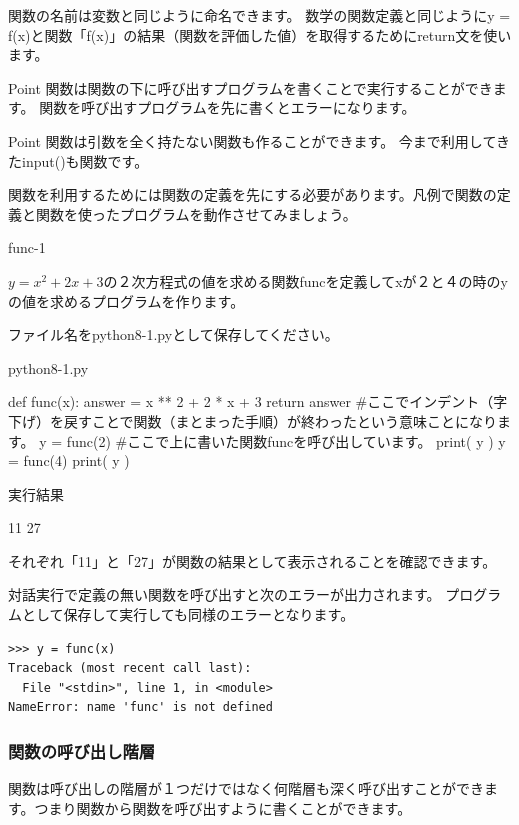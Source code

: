 \documentclass[11pt,a4paper,dvipdfmx,titlepage]{jsreport}
\begin{document}
関数の名前は変数と同じように命名できます。
数学の関数定義と同じようにy = f(x)と関数「f(x)」の結果（関数を評価した値）を取得するためにreturn文を使います。
\begin{hipoint}{Point}
関数は関数の下に呼び出すプログラムを書くことで実行することができます。
関数を呼び出すプログラムを先に書くとエラーになります。
\end{hipoint}


\begin{hipoint}{Point}
関数は引数を全く持たない関数も作ることができます。
今まで利用してきたinput()も関数です。
\end{hipoint}
関数を利用するためには関数の定義を先にする必要があります。凡例で関数の定義と関数を使ったプログラムを動作させてみましょう。
\newpage
\begin{pabox}{func-1}

$y = x^2 + 2 x + 3$の２次方程式の値を求める関数funcを定義してxが２と４の時のyの値を求めるプログラムを作ります。

ファイル名をpython8-1.pyとして保存してください。
\begin{codebox}{python8-1.py}
\begin{listing}{1}
def func(x):
    answer = x ** 2 + 2 * x + 3
    return answer
#ここでインデント（字下げ）を戻すことで関数（まとまった手順）が終わったという意味ことになります。
y = func(2) #ここで上に書いた関数funcを呼び出しています。
print( y )
y = func(4)
print( y )
\end{listing}
実行結果
\begin{listing}{1}
11
27
\end{listing}
\end{codebox}

それぞれ「11」と「27」が関数の結果として表示されることを確認できます。
\end{pabox}
 {\gt 対話実行}で定義の無い関数を呼び出すと次のエラーが出力されます。
プログラムとして保存して実行しても同様のエラーとなります。
\begin{verbatim}
>>> y = func(x)
Traceback (most recent call last):
  File "<stdin>", line 1, in <module>
NameError: name 'func' is not defined
\end{verbatim}

\subsubsection{関数の呼び出し階層}
関数は呼び出しの階層が１つだけではなく何階層も深く呼び出すことができます。つまり関数から関数を呼び出すように書くことができます。
\end{document}
